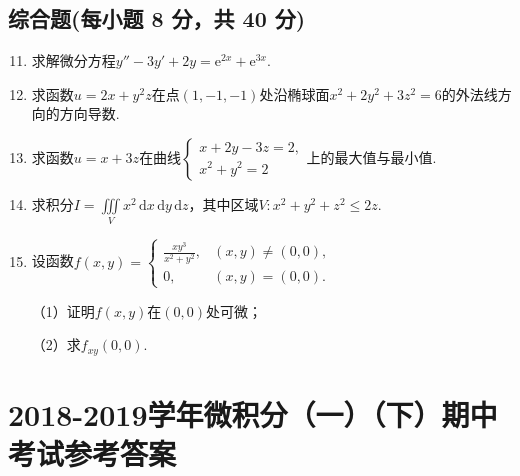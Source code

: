 \documentclass[../Main.tex]{subfiles}
\begin{document}
\section{综合题(每小题 8 分，共 40 分)}
\begin{enumerate}
    \setcounter{enumi}{10}

    \item 求解微分方程$y''-3y'+2y = \mathrm{e}^{2x}+\mathrm{e}^{3x}$.
          \vspace{12em}

    \item 求函数$u=2x+y^{2} z$在点$(1,-1,-1)$处沿椭球面$x^{2}+2y^{2}+3z^{2}=6$的外法线方向的方向导数.
          \vspace{11em}

    \item 求函数$u=x+3z$在曲线$\begin{cases}
                  x+2y-3z=2, \\
                  x^{2}+y^{2} = 2
              \end{cases}$上的最大值与最小值.
          \vspace{11em}

    \item 求积分$I=\iiint\limits_{V}x^{2}\,\mathrm{d}x\,\mathrm{d}y\,\mathrm{d}z$，其中区域$V
              :x^{2}+y^{2}+z^{2}\leq 2z$.
          \vspace{11em}

    \item 设函数$f(x,y)=
              \begin{cases}
                  \frac{xy^{3}}{x^{2}+y^{2}}, & (x,y)\neq (0,0), \\
                  0,                          & (x,y)=(0,0).
              \end{cases}$

          （1）证明$f(x,y)$在$(0,0)$处可微；

          （2）求$f_{xy}(0,0)$.
          \vspace{11em}
\end{enumerate}

\chapter{2018-2019学年微积分（一）（下）期中考试参考答案}
\end{document}
